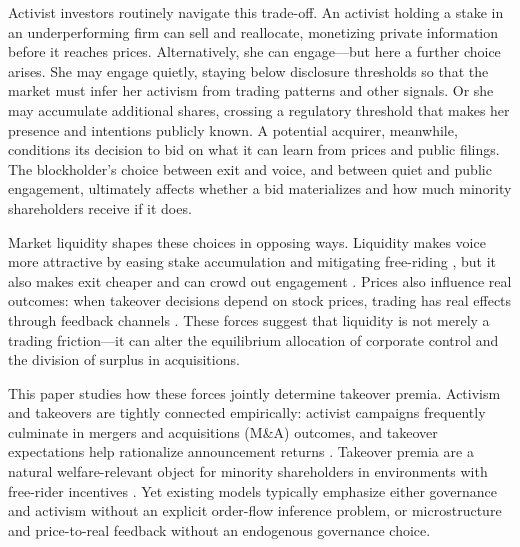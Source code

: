 \documentclass[11pt]{article}
\newcommand{\1}{\mathbf{1}}
\begin{document}
Activist investors routinely navigate this trade-off. An activist holding a stake in an underperforming firm can sell and reallocate, monetizing private information before it reaches prices. Alternatively, she can engage---but here a further choice arises. She may engage quietly, staying below disclosure thresholds so that the market must infer her activism from trading patterns and other signals. Or she may accumulate additional shares, crossing a regulatory threshold that makes her presence and intentions publicly known. A potential acquirer, meanwhile, conditions its decision to bid on what it can learn from prices and public filings. The blockholder's choice between exit and voice, and between quiet and public engagement, ultimately affects whether a bid materializes and how much minority shareholders receive if it does.

Market liquidity shapes these choices in opposing ways. Liquidity makes voice more attractive by easing stake accumulation and mitigating free-riding \citep{Maug1998}, but it also makes exit cheaper and can crowd out engagement \citep{Coffee1991,Bhide1993}. Prices also influence real outcomes: when takeover decisions depend on stock prices, trading has real effects through feedback channels \citep{BondEdmansGoldstein2012,EdmansGoldsteinJiang2012}. These forces suggest that liquidity is not merely a trading friction---it can alter the equilibrium allocation of corporate control and the division of surplus in acquisitions.

This paper studies how these forces jointly determine takeover premia. Activism and takeovers are tightly connected empirically: activist campaigns frequently culminate in mergers and acquisitions (M\&A) outcomes, and takeover expectations help rationalize announcement returns \citep{BravJiangPartnoyThomas2008,GreenwoodSchor2009}. Takeover premia are a natural welfare-relevant object for minority shareholders in environments with free-rider incentives \citep{GrossmanHart1980}. Yet existing models typically emphasize either governance and activism without an explicit order-flow inference problem, or microstructure and price-to-real feedback without an endogenous governance choice.
\end{document}
